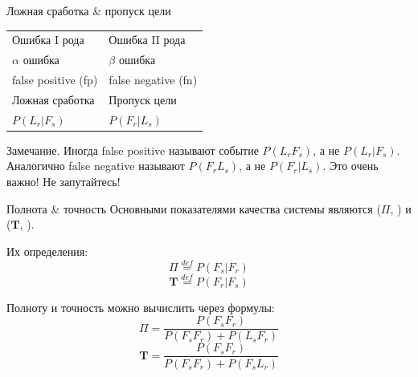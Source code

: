   \begin{frame}{Ложная сработка \& пропуск цели} 
	\begin{center}
		\LARGE
		\begin{tabular}{l|l}
			Ошибка I рода & Ошибка II рода \\
			$\alpha$ ошибка & $\beta$ ошибка \\
			false positive (fp) & false negative (fn) \\ 
			Ложная сработка  & Пропуск цели \\
			$P(L_r|F_s)$ & $P(F_r |L_s)$\\
		\end{tabular}
	\end{center}
	
	\begin{block}{Замечание.}
		Иногда false positive называют событие $P(L_r F_s)$, а не $P(L_r | F_s)$.
		Аналогично false negative называют $P(F_r  L_s)$, а не $P(F_r | L_s)$.
		Это очень важно! Не запутайтесь!
	\end{block}
\end{frame}



\begin{frame}{Полнота \& точность}\label{frame:presicion_recall}
	\small
	Основными показателями качества системы являются 
	 ($\Pi$, ) 
	и 
	 ($\boldsymbol T$, ).
	
	Их определения:
	\begin{equation}\label{eq:recall_def}
	\Pi \stackrel{def}{=} P(F_s | F_r)
	\end{equation}
	\begin{equation}\label{eq:precision_def}
	\boldsymbol T \stackrel{def}{=} P(F_r | F_s)
	\end{equation}
	
	Полноту и точность можно вычислить через формулы:
	\begin{equation}\label{eq:recall_calc}
	\Pi = \frac{P(F_s  F_r)}{P(F_s F_r) + P(L_s F_r)}
	\end{equation}
	\begin{equation}\label{eq:precision_calc}
	\boldsymbol T = \frac{P(F_s F_r)}{P(F_s F_r) + P(F_s L_r)}
	\end{equation}
	
\end{frame}


